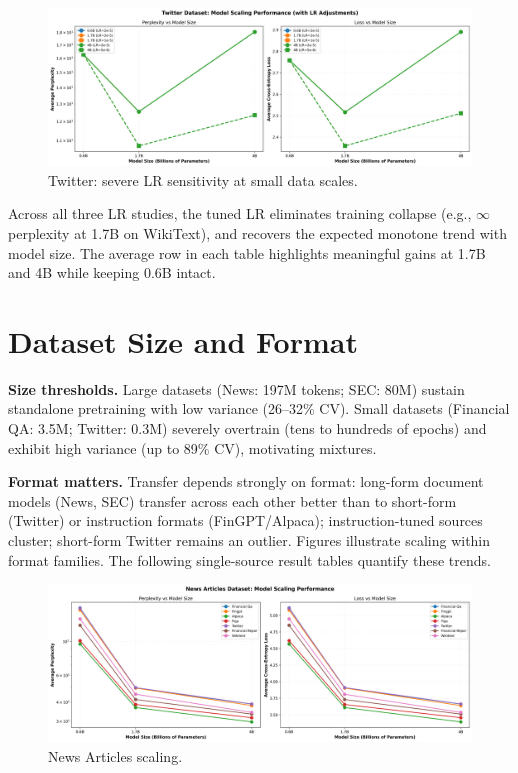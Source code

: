 {\tighttable
}

\begin{figure}[H]
  \centering
  \includegraphics[width=\textwidth]{../thesis/figures/scaling_twitter.png}
  \caption{Twitter: severe LR sensitivity at small data scales.}\label{fig:scaling_twitter}
\end{figure}

{\tighttable
}

Across all three LR studies, the tuned LR eliminates training collapse (e.g., $\infty$ perplexity at 1.7B on WikiText), and recovers the expected monotone trend with model size. The average row in each table highlights meaningful gains at 1.7B and 4B while keeping 0.6B intact.

\section{Dataset Size and Format}
\textbf{Size thresholds.} Large datasets (News: 197M tokens; SEC: 80M) sustain standalone pretraining with low variance (26--32\% CV). Small datasets (Financial QA: 3.5M; Twitter: 0.3M) severely overtrain (tens to hundreds of epochs) and exhibit high variance (up to 89\% CV), motivating mixtures.

\textbf{Format matters.} Transfer depends strongly on format: long-form document models (News, SEC) transfer across each other better than to short-form (Twitter) or instruction formats (FinGPT/Alpaca); instruction-tuned sources cluster; short-form Twitter remains an outlier. Figures  illustrate scaling within format families. The following single-source result tables quantify these trends.

\begin{figure}[H]
  \centering
  \includegraphics[width=\textwidth]{../thesis/figures/scaling_news_articles.png}
  \caption{News Articles scaling.}\label{fig:scaling_news_articles}
\end{figure}

